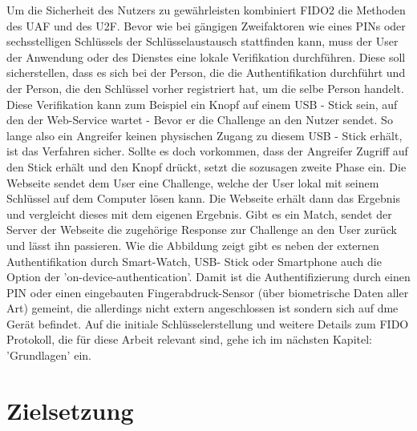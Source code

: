 Um die Sicherheit des Nutzers zu gewährleisten kombiniert FIDO2 die Methoden des UAF und des U2F. Bevor wie bei gängigen Zweifaktoren wie eines PINs oder sechsstelligen Schlüssels der Schlüsselaustausch stattfinden kann, muss der User der Anwendung oder des Dienstes eine lokale Verifikation durchführen. Diese soll sicherstellen, dass es sich bei der Person, die die Authentifikation durchführt und der Person, die den Schlüssel vorher registriert hat, um die selbe Person handelt. Diese Verifikation kann zum Beispiel ein Knopf auf einem USB - Stick sein, auf den der Web-Service wartet - Bevor er die Challenge an den Nutzer sendet. So lange also ein Angreifer keinen physischen Zugang zu diesem USB - Stick erhält, ist das Verfahren sicher. Sollte es doch vorkommen, dass der Angreifer Zugriff auf den Stick erhält und den Knopf drückt, setzt die sozusagen zweite Phase ein. Die Webseite sendet dem User eine Challenge, welche der User lokal mit seinem Schlüssel auf dem Computer lösen kann. Die Webseite erhält dann das Ergebnis und vergleicht dieses mit dem eigenen Ergebnis. Gibt es ein Match, sendet der Server der Webseite die zugehörige Response zur Challenge an den User zurück und lässt ihn passieren. Wie die Abbildung zeigt gibt es neben der externen Authentifikation durch Smart-Watch, USB- Stick oder Smartphone auch die Option der 'on-device-authentication'. Damit ist die Authentifizierung durch einen PIN oder einen eingebauten Fingerabdruck-Sensor (über biometrische Daten aller Art) gemeint, die allerdings nicht extern angeschlossen ist sondern sich auf dme Gerät befindet. Auf die initiale Schlüsselerstellung und weitere Details zum FIDO Protokoll, die für diese Arbeit relevant sind, gehe ich im nächsten Kapitel: 'Grundlagen' ein.

\section{Zielsetzung}
\blindtext
